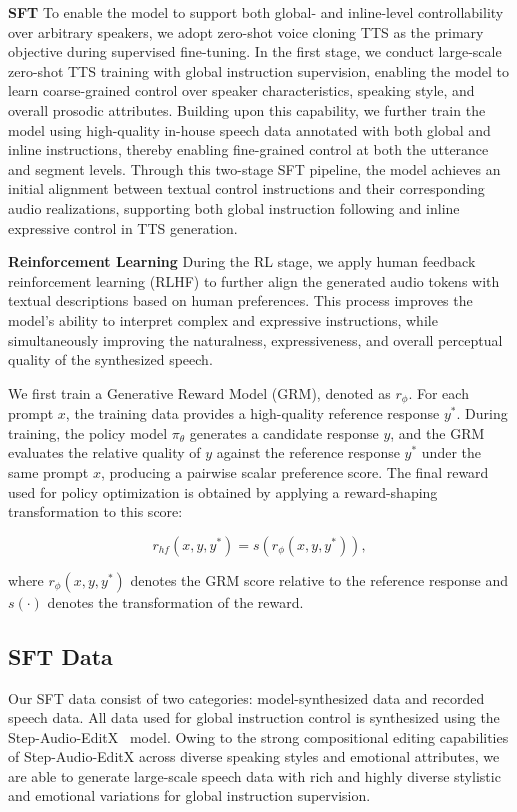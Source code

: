 \documentclass{llmxive}
\begin{document}
\textbf{SFT}
To enable the model to support both global- and inline-level controllability over arbitrary speakers, we adopt zero-shot voice cloning TTS as the primary objective during supervised fine-tuning. In the first stage, we conduct large-scale zero-shot TTS training with global instruction supervision, enabling the model to learn coarse-grained control over speaker characteristics, speaking style, and overall prosodic attributes. Building upon this capability, we further train the model using high-quality in-house speech data annotated with both global and inline instructions, thereby enabling fine-grained control at both the utterance and segment levels. Through this two-stage SFT pipeline, the model achieves an initial alignment between textual control instructions and their corresponding audio realizations, supporting both global instruction following and inline expressive control in TTS generation.

\textbf{Reinforcement Learning}
During the RL stage, we apply human feedback reinforcement learning (RLHF) to further align the generated audio tokens with textual descriptions based on human preferences. This process improves the model’s ability to interpret complex and expressive instructions, while simultaneously improving the naturalness, expressiveness, and overall perceptual quality of the synthesized speech. 

We first train a Generative Reward Model (GRM), denoted as $r_\phi$. For each prompt $x$, the training data provides a high-quality reference response $y^*$. During training, the policy model $\pi_\theta$ generates a candidate response $y$, and the GRM evaluates the relative quality of $y$ against the reference response $y^*$ under the same prompt $x$, producing a pairwise scalar preference score. The final reward used for policy optimization is obtained by applying a reward-shaping transformation to this score:

\begin{equation}
r_{hf}(x, y, y^*) = s\!\left(r_\phi(x, y, y^*)\right),
\end{equation}

where $r_\phi(x, y, y^*)$ denotes the GRM score relative to the reference response and $s(\cdot)$ denotes the transformation of the reward.


\subsection{SFT Data}
\label{sec:SFT-data}
Our SFT data consist of two categories: model-synthesized data and recorded speech data. All data used for global instruction control is synthesized using the Step-Audio-EditX~\citep{yan2025stepaudioeditxtechnicalreport} model. Owing to the strong compositional editing capabilities of Step-Audio-EditX across diverse speaking styles and emotional attributes, we are able to generate large-scale speech data with rich and highly diverse stylistic and emotional variations for global instruction supervision.
\end{document}
